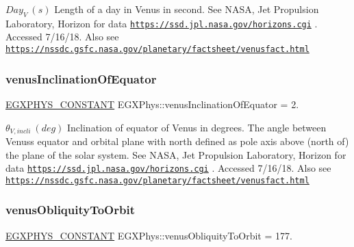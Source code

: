 $ Day_{V} \ (s)$ Length of a day in Venus in second. See N\+A\+SA, Jet Propulsion Laboratory, Horizon for data \href{https://ssd.jpl.nasa.gov/horizons.cgi}{\tt https\+://ssd.\+jpl.\+nasa.\+gov/horizons.\+cgi} . Accessed 7/16/18. Also see \href{https://nssdc.gsfc.nasa.gov/planetary/factsheet/venusfact.html}{\tt https\+://nssdc.\+gsfc.\+nasa.\+gov/planetary/factsheet/venusfact.\+html} \mbox{\label{group___e_g_x_phys-_constants-_astrophysics-_solar_system-_venus-_orbit_ga53a16fb99d0559c47885d1b410c32401}} 
\subsubsection{\texorpdfstring{venus\+Inclination\+Of\+Equator}{venusInclinationOfEquator}}
{\footnotesize\ttfamily \mbox{\hyperlink{group___e_g_x_phys-_constants-_macros_ga76980d288494ce1714c9ac68a95ba702}{E\+G\+X\+P\+H\+Y\+S\+\_\+\+C\+O\+N\+S\+T\+A\+NT}} E\+G\+X\+Phys\+::venus\+Inclination\+Of\+Equator = 2.}

$ \theta_{V,incli} \ (deg)$ Inclination of equator of Venus in degrees. The angle between Venus\textquotesingle{}s equator and orbital plane with north defined as pole axis above (north of) the plane of the solar system. See N\+A\+SA, Jet Propulsion Laboratory, Horizon for data \href{https://ssd.jpl.nasa.gov/horizons.cgi}{\tt https\+://ssd.\+jpl.\+nasa.\+gov/horizons.\+cgi} . Accessed 7/16/18. Also see \href{https://nssdc.gsfc.nasa.gov/planetary/factsheet/venusfact.html}{\tt https\+://nssdc.\+gsfc.\+nasa.\+gov/planetary/factsheet/venusfact.\+html} \mbox{\label{group___e_g_x_phys-_constants-_astrophysics-_solar_system-_venus-_orbit_ga6ece4191c84ea60e64f195d42e99e71c}} 
\subsubsection{\texorpdfstring{venus\+Obliquity\+To\+Orbit}{venusObliquityToOrbit}}
{\footnotesize\ttfamily \mbox{\hyperlink{group___e_g_x_phys-_constants-_macros_ga76980d288494ce1714c9ac68a95ba702}{E\+G\+X\+P\+H\+Y\+S\+\_\+\+C\+O\+N\+S\+T\+A\+NT}} E\+G\+X\+Phys\+::venus\+Obliquity\+To\+Orbit = 177.}

